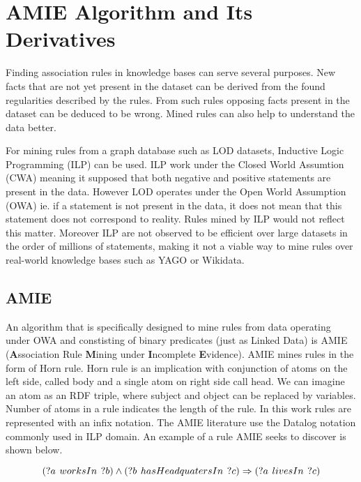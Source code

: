 \chapter{AMIE Algorithm and Its Derivatives}

Finding association rules in knowledge bases can serve several purposes. New facts that are not yet present in the dataset can be derived from the found regularities described by the rules. From such rules opposing facts present in the dataset can be deduced to be wrong. Mined rules can also help to understand the data better.

For mining rules from a graph database such as LOD datasets, Inductive Logic Programming (ILP) can be used. ILP work under the Closed World Assumtion (CWA) meaning it supposed that both negative and positive statements are present in the data. However LOD operates under the Open World Assumption (OWA) ie. if a statement is not present in the data, it does not mean that this statement does not correspond to reality. Rules mined by ILP would not reflect this matter. Moreover ILP are not observed to be efficient over large datasets in the order of millions of statements, making it not a viable way to mine rules over real-world knowledge bases such as YAGO or Wikidata.

\section{AMIE}

An algorithm that is specifically designed to mine rules from data operating under OWA and constisting of binary predicates (just as Linked Data) is AMIE (\textbf{A}ssociation Rule \textbf{M}ining under \textbf{I}ncomplete \textbf{E}vidence).\cite{Galarraga2013} AMIE mines rules in the form of Horn rule. Horn rule is an implication with conjunction of atoms on the left side, called body and a single atom on right side call head. We can imagine an atom as an RDF triple, where subject and object can be replaced by variables. Number of atoms in a rule indicates the length of the rule. In this work rules are represented with an infix notation. The AMIE literature use the Datalog notation commonly used in ILP domain. An example of a rule AMIE seeks to discover is shown below. 

$$
(?a\hspace{0.4em}worksIn\hspace{0.4em}?b) \land
(?b\hspace{0.4em}hasHeadquatersIn\hspace{0.4em}?c) \Rightarrow
(?a\hspace{0.4em}livesIn\hspace{0.4em}?c)
$$

